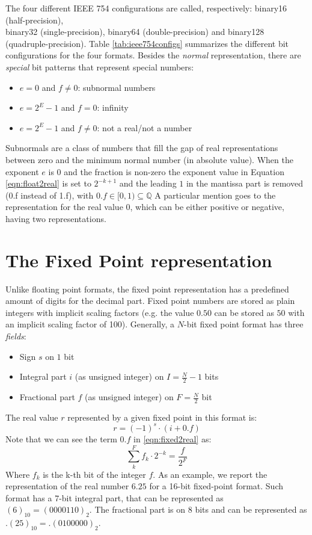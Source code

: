 The four different IEEE 754 configurations are called, respectively: binary16 (half-precision), \\binary32 (single-precision), binary64 (double-precision) and binary128 (quadruple-precision). Table \ref{tab:ieee754configs} summarizes the different bit configurations for the four formats.
Besides the \textit{normal} representation, there are \textit{special} bit patterns that represent special numbers:
\begin{itemize}
    \item $e = 0$ and $f \neq 0$: subnormal numbers
    \item $e = 2^{E} - 1$ and $f = 0$: infinity
    \item $e = 2^{E} - 1$ and $f \neq 0$: not a real/not a number
\end{itemize}
Subnormals are a class of numbers that fill the gap of real representations between zero and the minimum normal number (in absolute value). When the exponent $e$ is $0$ and the fraction is non-zero the exponent value in Equation \ref{eqn:float2real} is set to $2^{-k+1}$ and the leading $1$ in the mantissa part is removed (0.f instead of 1.f), with $0.f \in [0,1) \subseteq \mathbb{Q}$
A particular mention goes to the representation for the real value $0$, which can be either positive or negative, having two representations.

\section{The Fixed Point representation}

Unlike floating point formats, the fixed point representation has a predefined amount of digits for the decimal part. Fixed point numbers are stored as plain integers with implicit scaling factors (e.g. the value $0.50$ can be stored as $50$ with an implicit scaling factor of 100). Generally, a $N$-bit fixed point format has three \textit{fields}:

\begin{itemize}
    \item Sign $s$ on $1$ bit
    \item Integral part $i$ (as unsigned integer) on $I = \frac{N}{2} - 1$ bits
    \item Fractional part $f$ (as unsigned integer) on $F = \frac{N}{2}$ bit
\end{itemize}
The real value $r$ represented by a given fixed point in this format is:
\begin{equation}\label{eqn:fixed2real}
    r = (-1)^s \cdot \left( i + 0.f \right)
\end{equation}
Note that we can see the term $0.f$ in \eqref{eqn:fixed2real} as:
\[
    \sum_k^F f_k \cdot 2^{-k} = \frac{f}{2^F}
\]
Where $f_k$ is the k-th bit of the integer $f$.
As an example, we report the representation of the real number $6.25$ for a 16-bit fixed-point format.
Such format has a 7-bit integral part, that can be represented as $(6)_{10} = {(0000110)}_{2}$.
The fractional part is on 8 bits and can be represented as $ .(25)_{10} = .(0100000)_{2}$.

